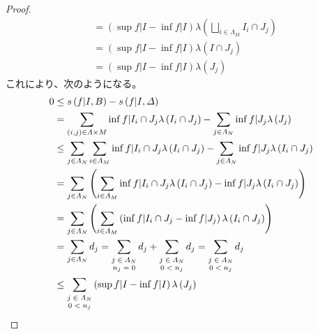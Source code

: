\documentclass[dvipdfmx]{jsarticle}
\begin{document}
\begin{proof}
\begin{align*}
&= \left( \sup{f|I} - \inf{f|I} \right)\lambda\left( \bigsqcup_{i \in \varLambda_{M}} I_{i} \cap J_{j} \right)\\
&= \left( \sup{f|I} - \inf{f|I} \right)\lambda\left( I \cap J_{j} \right)\\
&= \left( \sup{f|I} - \inf{f|I} \right)\lambda\left( J_{j} \right)
\end{align*}
これにより、次のようになる。
\begin{align*}
0 &\leq s\left( f|I,B \right) - s\left( f|I,\varDelta \right)\\
&= \sum_{(i,j) \in \varLambda \times M} {\inf{f|I_{i} \cap J_{j}}\lambda\left( I_{i} \cap J_{j} \right)} - \sum_{j \in \varLambda_{N}} {\inf{f|J_{j}}\lambda\left( J_{j} \right)}\\
&\leq \sum_{j \in \varLambda_{N}} {\sum_{i \in \varLambda_{M}} {\inf{f|I_{i} \cap J_{j}}\lambda\left( I_{i} \cap J_{j} \right)}} - \sum_{j \in \varLambda_{N}} {\inf{f|J_{j}}\lambda\left( I_{i} \cap J_{j} \right)}\\
&= \sum_{j \in \varLambda_{N}} \left( \sum_{i \in \varLambda_{M}} {\inf{f|I_{i} \cap J_{j}}\lambda\left( I_{i} \cap J_{j} \right)} - \inf{f|J_{j}}\lambda\left( I_{i} \cap J_{j} \right) \right)\\
&= \sum_{j \in \varLambda_{N}} \left( \sum_{i \in \varLambda_{M}} {\left( \inf{f|I_{i} \cap J_{j}} - \inf{f|J_{j}} \right)\lambda\left( I_{i} \cap J_{j} \right)} \right)\\
&= \sum_{j \in \varLambda_{N}} d_{j} = \sum_{\scriptsize \begin{matrix}
j \in \varLambda_{N} \\
n_{j} = 0 \\
\end{matrix}} d_{j} + \sum_{\scriptsize \begin{matrix}
j \in \varLambda_{N} \\
0 < n_{j} \\
\end{matrix}} d_{j} = \sum_{\scriptsize \begin{matrix}
j \in \varLambda_{N} \\
0 < n_{j} \\
\end{matrix}} d_{j}\\
&\leq \sum_{\scriptsize \begin{matrix}
j \in \varLambda_{N} \\
0 < n_{j} \\
\end{matrix}} {\left( \sup{f|I} - \inf{f|I} \right)\lambda\left( J_{j} \right)}\\

\end{align*}
\end{proof}
\end{document}
